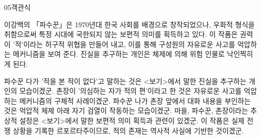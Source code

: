 \documentclass[fs85,seriesWit]{korfarm-base}
\begin{document}
\begin{kfQBlock}{05}{객관식}
\begin{kfEvidence}이강백의 「파수꾼」은 1970년대 한국 사회를 배경으로 창작되었으나, 우화적 형식을 취함으로써 특정 시대에 국한되지 않는 보편적 의미를 획득하고 있다. 이 작품은 권력이 '적'이라는 허구적 위협을 만들어 내고, 이를 통해 구성원의 자유로운 사고를 억압하는 메커니즘을 보여 준다. 진실을 추구하는 개인은 체제에 의해 위험 인물로 낙인찍히게 된다.\end{kfEvidence}
\begin{kfChoices}
\kfChoice 파수꾼 다가 '적을 본 적이 없다'고 말하는 것은 <보기>에서 말한 진실을 추구하는 개인의 모습이겠군.
\kfChoice 촌장이 '의심하는 자가 적의 편'이라고 한 것은 자유로운 사고를 억압하는 메커니즘의 구체적 사례이겠군.
\kfChoice 파수꾼 나가 촌장 앞에서 대화 내용을 부인하는 것은 억압적 체제 아래 자기 검열이 작동하는 모습이겠군.
\kfChoice 마을, 파수꾼, 촌장이라는 추상적 설정은 <보기>에서 말한 보편적 의미 획득과 관련이 있겠군.
\kfChoice 이 작품은 실제 전쟁 상황을 기록한 르포르타주이므로, 적의 존재는 역사적 사실에 기반한 것이겠군.
\end{kfChoices}
\end{kfQBlock}

\kfEndMC
\end{document}
